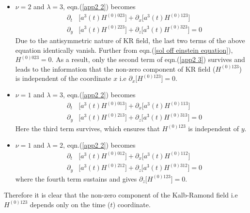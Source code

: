 \documentclass[a4paper]{article}
\begin{document}
\begin{itemize}
 \item $\nu = 2$ and $\lambda = 3$, eqn.(\ref{app2 2}) becomes
 \begin{eqnarray}
  &\partial_{t}&\bigg[a^3(t)H^{(0)023}\bigg] + \partial_{x}\bigg[a^3(t)H^{(0)123}\bigg]\nonumber\\
 &\partial_{y}&\bigg[a^3(t)H^{(0)223}\bigg] + \partial_{z}\bigg[a^3(t)H^{(0)323}\bigg] = 0
 \label{app2 3}
 \end{eqnarray}
Due to the antisymmetric nature of KR field, the last two terms of the above equation identically vanish. Further 
from eqn.(\ref{sol off einstein equation}), $H^{(0)023} = 0$. As a result, only the second term of eqn.(\ref{app2 3}) 
survives and leads to the information that the non-zero 
component of KR field ($H^{(0)123}$) is independent of the coordinate $x$ i.e $\partial_{x}\bigg[H^{(0)123}\bigg] = 0$.

\item $\nu = 1$ and $\lambda = 3$, eqn.(\ref{app2 2}) becomes
\begin{eqnarray}
  &\partial_{t}&\bigg[a^3(t)H^{(0)013}\bigg] + \partial_{x}\bigg[a^3(t)H^{(0)113}\bigg]\nonumber\\
 &\partial_{y}&\bigg[a^3(t)H^{(0)213}\bigg] + \partial_{z}\bigg[a^3(t)H^{(0)313}\bigg] = 0
 \label{app2 4}
 \end{eqnarray}
 Here the third term survives, which ensures that $H^{(0)123}$ is independent of $y$.
 
 \item $\nu = 1$ and $\lambda = 2$, eqn.(\ref{app2 2}) becomes
 \begin{eqnarray}
  &\partial_{t}&\bigg[a^3(t)H^{(0)012}\bigg] + \partial_{x}\bigg[a^3(t)H^{(0)112}\bigg]\nonumber\\
 &\partial_{y}&\bigg[a^3(t)H^{(0)212}\bigg] + \partial_{z}\bigg[a^3(t)H^{(0)312}\bigg] = 0
 \label{app2 5}
 \end{eqnarray}
 where the fourth term sustains and gives $\partial_{z}\bigg[H^{(0)123}\bigg] = 0$.
 
\end{itemize}

Therefore it is clear that the non-zero component of the Kalb-Ramond field i.e $H^{(0)123}$ depends only on the time ($t$) coordinate. 
\end{document}
